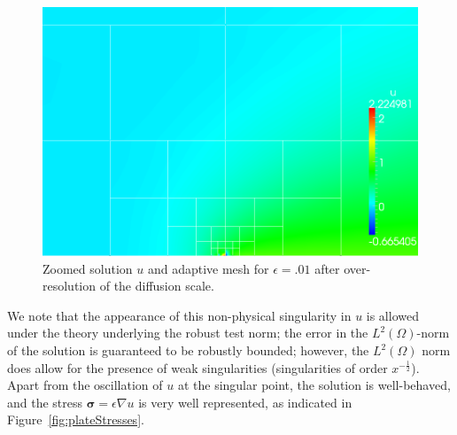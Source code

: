 \documentclass[letterpaper]{article}
\def\bsigma{\boldsymbol\sigma}
\newcommand{\LRp}[1]{\left( #1 \right)}
\newcommand{\Grad} {\ensuremath{\nabla}}
\renewcommand{\L}{L^2\LRp{\Omega}}
\begin{document}
\begin{figure}[!h]
\centering
\includegraphics[scale=.375]{figs/LaplaceFigs/confusion1e2h1e3uZoom.png}
\caption{Zoomed solution $u$ and adaptive mesh for $\epsilon = .01$ after over-resolution of the diffusion scale. }
\label{fig:plateOscZoom}
\end{figure}

We note that the appearance of this non-physical singularity in $u$ is allowed
under the theory underlying the robust test norm; the error in the $\L$-norm
of the solution is guaranteed to be robustly bounded; however, the $\L$ norm
does allow for the presence of weak singularities (singularities of order
$x^{-\frac{1}{2}}$).  Apart from the oscillation of $u$ at the singular point,
the solution is well-behaved, and the stress $\bsigma = \epsilon \Grad u$ is
very well represented, as indicated in Figure~\ref{fig:plateStresses}.
\end{document}
